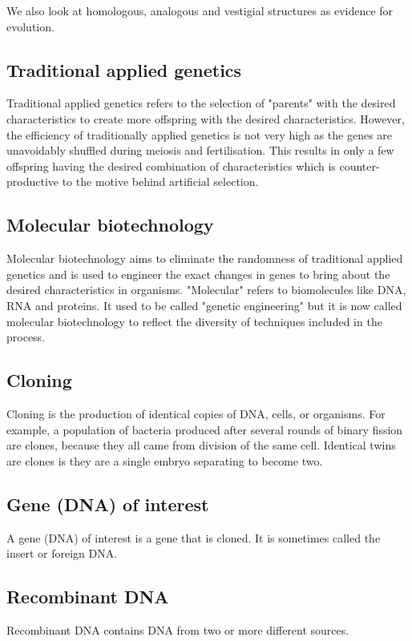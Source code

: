 \documentclass[11pt]{article}
\begin{document}
We also look at homologous, analogous and vestigial structures as evidence for evolution.

\subsection{Traditional applied genetics}
\label{sec:org5a48fb8}
Traditional applied genetics refers to the selection of "parents" with the desired characteristics to create more offspring with the desired characteristics. However, the efficiency of traditionally applied genetics is not very high as the genes are unavoidably shuffled during meiosis and fertilisation. This results in only a few offspring having the desired combination of characteristics which is counter-productive to the motive behind artificial selection.

\subsection{Molecular biotechnology}
\label{sec:org44088e1}
Molecular biotechnology aims to eliminate the randomness of traditional applied genetics and is used to engineer the exact changes in genes to bring about the desired characteristics in organisms. "Molecular" refers to biomolecules like DNA, RNA and proteins. It used to be called "genetic engineering" but it is now called molecular biotechnology to reflect the diversity of techniques included in the process.

\subsection{Cloning}
\label{sec:org9351082}
Cloning is the production of identical copies of DNA, cells, or organisms. For example, a population of bacteria produced after several rounds of binary fission are clones, because they all came from division of the same cell. Identical twins are clones is they are a single embryo separating to become two.

\subsection{Gene (DNA) of interest}
\label{sec:orgd717e3c}
A gene (DNA) of interest is a gene that is cloned. It is sometimes called the insert or foreign DNA.

\subsection{Recombinant DNA}
\label{sec:org863bf5a}
Recombinant DNA contains DNA from two or more different sources.
\end{document}
